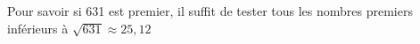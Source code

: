 
Pour savoir si 631 est premier, il suffit de tester tous les nombres premiers inférieurs à $\sqrt{631}\approx25,12$
